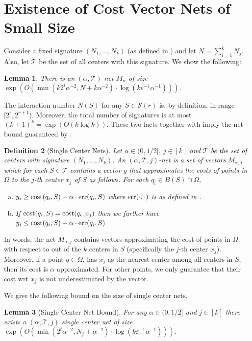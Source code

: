 \documentclass[11pt]{article}
\newtheorem{lemma}{Lemma}[section]
\newtheorem{definition}[lemma]{Definition}
\theoremstyle{restate}
\theoremstyle{definition}
\newcommand{\eps}{\ensuremath{\varepsilon}}
\newcommand{\cost}{\textnormal{cost}}
\newcommand{\err}{\textnormal{err}}
\begin{document}
\section{Existence of Cost Vector Nets of Small Size} \label{app: nets}
Consider a fixed signature $(N_1, \ldots, N_k)$ (as defined in ) and let $N = \sum_{i= 1}^k N_j$. Also, let  $\mathcal{T}$ be the set of all centers with this signature. We show  the following:
\begin{lemma}\label{lem: net-lemma-signature}
    There is an $(\alpha, \mathcal{T})$-net $M_\alpha$ of size $\exp(O(\min(k2^t \alpha^{-2}, N + k \alpha^{-2}) \cdot \log(k \eps^{-1} \alpha^{-1})))$. 
\end{lemma}
\noindent 
 The interaction number $N(S)$ for any $S \in \mathcal{S}(r)$ is, by definition, in range $[2^r, 2^{r+1})$. Moreover, the total number of signatures is at most $(k+1)^k=\exp(O(k \log k))$. These two facts together with  imply the net bound guaranteed by .
\begin{definition}[Single Center Nets]\label{def: single-center-net}
    Let $\alpha \in (0,1/2]$, $j \in [k]$ and $\mathcal{T}$ be the set of centers with signature $(N_1, \ldots, N_k)$. An $(\alpha, \mathcal{T},j)$-net is a set of vectors $M_{\alpha,j}$ which for each $S \in \mathcal{T}$ contains a vector $y$ that approximates the costs of points in $\Omega$ to the $j$-th center $x_j$ of $S$ as follows. For each $q_i \in B(S) \cap \Omega$, 
	\begin{enumerate}[(a)]
            \item \label{item: scn-item1} $ y_i \geq \cost(q_i,S) - \alpha \cdot \err(q_i,S)$ where $\err(\cdot, \cdot)$ is as defined in .
		\item  If $\cost(q_i,S) = \cost(q_i, x_j)$ then we further have $y_{i} \leq \cost(q_i,S) + \alpha \cdot \err(q_i,S)$ 
	\end{enumerate}
\end{definition}
In words, the net $M_{\alpha,j}$ contains vectors approximating the cost of points in $\Omega$ with respect to out of the $k$ centers in $S$ (specifically the $j$-th center $x_j$). Moreover, if a point $q \in \Omega$, has $x_j$ as the nearest center among all centers in $S$, then its cost is $\alpha$ approximated. For other points, we only guarantee that their cost wrt $x_j$ is not underestimated by the vector.

We give the following bound on the size of single center nets.
\begin{lemma}[Single Center Net Bound]\label{lem: single-center-net}
	For any $\alpha \in (0,1/2]$ and $j \in [k]$ there exists a $(\alpha, \mathcal{T},j)$ single center net of size $\exp(O(\min(2^t  \alpha^{-2}, N_j + \alpha^{-2}) \cdot \log(k \eps^{-1} \alpha^{-1})))$.
\end{lemma}
\end{document}
